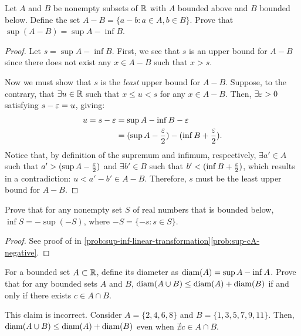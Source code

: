 \begin{problem}\label{prob:sup-A-minus-B}
  Let $A$ and $B$ be nonempty subsets of $\mathbb{R}$ with $A$ bounded above and $B$
  bounded below. Define the set $A - B = \{ a - b : a \in A, b \in B\}$.
  Prove that $\sup(A-B) = \sup A - \inf B$.
\end{problem}

\begin{proof}
  Let $s = \sup A - \inf B$. First, we see that $s$ is an upper bound
  for $A - B$ since there does not exist any $x \in A - B$ such that $x > s$.

  Now we must show that $s$ is the \textit{least} upper bound for $A - B$. Suppose,
  to the contrary, that $\exists u \in \mathbb{R}$ such that $x \leq u < s$ for any $x \in A - B$.
  Then, $\exists \varepsilon > 0$ satisfying $s - \varepsilon = u$, giving:
  \begin{align*}
    u = s - \varepsilon &= \sup A - \inf B - \varepsilon \\
                 &= (\sup A - \frac{\varepsilon}{2}) - (\inf B + \frac{\varepsilon}{2}). \\ 
  \end{align*}
  Notice that, by definition of the supremum and infimum, respectively,
  $\exists a' \in A$ such that $a' > (\sup A - \frac{\varepsilon}{2})$ and $\exists b'
  \in B$ such that $b' < (\inf B + \frac{\varepsilon}{2})$, which results in a
  contradiction: $u < a' - b' \in A - B$. Therefore, $s$ must be the least
  upper bound for $A - B$.
\end{proof}

\begin{problem}
  Prove that for any nonempty set $S$ of real numbers that is bounded below,
  $\inf S = - \sup(-S)$, where $-S = \{ -s : s \in S\}$.
\end{problem}

\begin{proof}
  See proof of  in \ref{prob:sup-inf-linear-transformation}\ref{prob:sup-cA-negative}.
\end{proof}

\begin{problem}
  For a bounded set $A \subset \mathbb{R}$, define its diameter as $\operatorname{diam}(A) = \sup A -
  \inf A$. Prove that for any bounded sets $A$ and $B$, $\operatorname{diam}(A \cup B) \leq
  \operatorname{diam}(A) + \operatorname{diam}(B)$ if and only if there exists $c \in A \cap B$.
\end{problem}

\begin{callout}
  This claim is incorrect. Consider $A = \{2, 4, 6, 8\}$ and $B = \{1, 3, 5, 7, 9, 11 \}$.
  Then, $\operatorname{diam}(A \cup B) \leq \operatorname{diam}(A) + \operatorname{diam}(B)$ even when $\nexists c \in A \cap B$. 
\end{callout}

